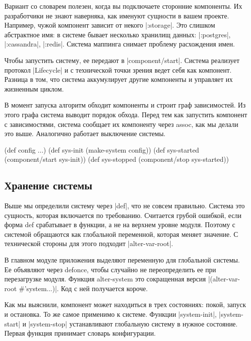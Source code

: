 Вариант со словарем полезен, когда вы подключаете сторонние компоненты. Их
разработчики не знают наверняка, как именуют сущности в вашем проекте. Например,
чужой компонент зависит от некого \spverb|:storage|. Это слишком абстрактное имя: в
системе бывает несколько хранилищ данных: \spverb|:postgres|, \spverb|:cassandra|,
\spverb|:redis|. Система маппинга снимает проблему расхождения имен.

Чтобы запустить систему, ее передают в \spverb|component/start|. Система реализует
протокол \spverb|Lifecycle| и с технической точки зрения ведет себя как
компонент. Разница в том, что система аккумулирует другие компоненты и управляет
их жизненным циклом.

В момент запуска алгоритм обходит компоненты и строит граф зависимостей. Из
этого графа система выводит порядок обхода. Перед тем как запустить компонент с
зависимостями, система сообщает их компоненту через assoc, как мы делали это
выше. Аналогично работает выключение системы.

\begin{code}
(def config {...})
(def sys-init (make-system config))
(def sys-started (component/start sys-init))
(def sys-stopped (component/stop sys-started))
\end{code}

\subsection{Хранение системы}

Выше мы определили систему через \spverb|def|, что не совсем правильно. Система это
сущность, которая включается по требованию. Считается грубой ошибкой, если форма
def срабатывает в функции, а не на верхнем уровне модуля. Поэтому с системой
обращаются как глобальной переменной, которая меняет значение. С технической
стороны для этого подходит \spverb|alter-var-root|.

В главном модуле приложения выделяют переменную для глобальной системы. Ее
объявляют через defonce, чтобы случайно не переопределить ее при перезагрузке
модуля. Функция alter-system это сокращенная версия \spverb|(alter-var-root #'system...)|.
Код с ней получается короче.

Как мы выяснили, компонент может находиться в трех состояниях: покой, запуск и
остановка. То же самое применимо к системе. Функции \spverb|system-init|,
\spverb|system-start| и \spverb|system-stop| устанавливают глобальную систему в нужное
состояние. Первая функция принимает словарь конфигурации.

